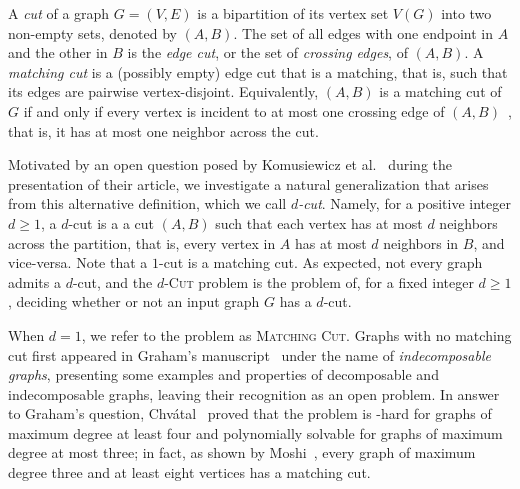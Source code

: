 \documentclass[a4paper,UKenglish,cleveref, autoref]{lipics-v2019}
\newcommand{\probl}[3]{
  \begin{flushleft}
    \fbox{
      \begin{minipage}{13.5cm}
        \noindent {\sc #1}\\
        {\bf Instance:} #2\\
        {\bf Question:} #3
      \end{minipage}}
    \medskip
  \end{flushleft}
}
\newcommand{\pname}[1]{\textsc{#1}}
\newcommand{\tdef}[1]{\emph{#1}}
\begin{document}
 A \tdef{cut} of a graph $G = (V, E)$ is a bipartition of its vertex set $V(G)$ into two non-empty sets, denoted by $(A,B)$.
The set of all edges with one endpoint in $A$ and the other in $B$ is the \tdef{edge cut}, or the set of \tdef{crossing edges}, of $(A,B)$.
A \tdef{matching cut} is a (possibly empty) edge cut that is a matching, that is, such that its edges are pairwise vertex-disjoint. Equivalently, $(A, B)$ is a matching cut of $G$ if and only if every vertex is incident to at most one crossing edge of $(A, B)$~\cite{matching_cut_graham, chvatal_matching_cut}, that is, it has at most one neighbor across the cut.

Motivated by an open question posed by Komusiewicz et al.~\cite{matching_cut_ipec} during the presentation of their article,  we investigate a natural generalization that arises from this alternative definition, which we call \tdef{$d$-cut}.
Namely, for a positive integer $d \geq 1$, a $d$-cut is a a cut $(A, B)$ such that each vertex has at most $d$ neighbors across the partition, that is, every vertex in $A$ has at most $d$ neighbors in $B$, and vice-versa. Note that a $1$-cut is a matching cut.
As expected, not every graph admits a $d$-cut, and the \pname{$d$-Cut} problem is the problem of, for a fixed integer $d \geq 1$, deciding whether or not an input graph $G$ has a $d$-cut.


When $d=1$, we refer to the problem as \pname{Matching Cut}.
Graphs with no matching cut first appeared in Graham's manuscript~\cite{matching_cut_graham} under the name of \textit{indecomposable graphs}, presenting some examples and properties of decomposable and indecomposable graphs, leaving their recognition as an open problem.
In answer to Graham's question, Chv\'atal~\cite{chvatal_matching_cut} proved that the problem is \NP-hard for graphs of maximum degree at least four and polynomially solvable for graphs of maximum degree at most three; in fact, as shown by Moshi~\cite{matching_cut_moshi}, every graph of maximum degree three and at least eight vertices has a matching cut.
\end{document}
